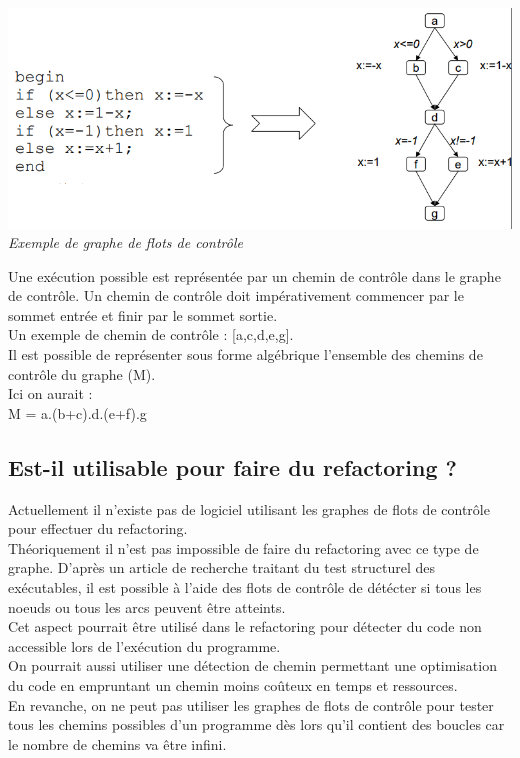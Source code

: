 \documentclass[a4paper,twoside,12pt,openright]{report}
\begin{document}
\begin{center}
\includegraphics[scale=0.7]{Image/GFC.png}\\
\itshape{Exemple de graphe de flots de contrôle\cite{ref11}}
\end{center}

Une exécution possible est représentée par un chemin de contrôle dans le graphe de contrôle. Un chemin de contrôle doit impérativement commencer par le sommet entrée et finir par le sommet sortie.\\
Un exemple de chemin de contrôle : [a,c,d,e,g].\\
Il est possible de représenter sous forme algébrique l'ensemble des chemins de contrôle du graphe (M).\\
Ici on aurait :\\
M = a.(b+c).d.(e+f).g\\

\subsection{Est-il utilisable pour faire du refactoring ?}
Actuellement il n'existe pas de logiciel utilisant les graphes de flots de contrôle pour effectuer du refactoring.\\
Théoriquement il n'est pas impossible de faire du refactoring avec ce type de graphe.
D'après un article de recherche traitant du test structurel des exécutables, il est possible à l'aide des flots de contrôle de détécter si tous les noeuds ou tous les arcs peuvent être atteints\cite{ref12}.\\
Cet aspect pourrait être utilisé dans le refactoring pour détecter du code non accessible lors de l'exécution du programme.\\
On pourrait aussi utiliser une détection de chemin
permettant une optimisation du code en empruntant un chemin moins coûteux en temps et ressources.\\
En revanche, on ne peut pas utiliser les graphes de flots de contrôle pour tester tous les chemins possibles d'un programme dès lors qu'il contient des boucles car le nombre de chemins va être infini.\\
\end{document}
